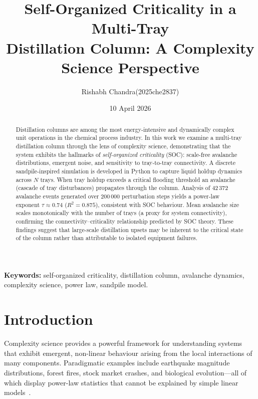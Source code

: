 \documentclass[twocolumn,12pt]{article}
\title{\textbf{Self-Organized Criticality in a Multi-Tray\\
       Distillation Column: A Complexity Science Perspective}}
\author{Rishabh Chandra(2025che2837)}
\affil{Department of Chemical Engineering IIT Delhi}
\date{10 April 2026}
\begin{document}
\maketitle
\thispagestyle{fancy}

\begin{abstract}
\noindent
Distillation columns are among the most energy-intensive and dynamically
complex unit operations in the chemical process industry.  In this work we
examine a multi-tray distillation column through the lens of complexity
science, demonstrating that the system exhibits the hallmarks of
\textit{self-organized criticality} (SOC): scale-free avalanche distributions,
emergent noise, and sensitivity to tray-to-tray connectivity.  A discrete
sandpile-inspired simulation is developed in Python to capture liquid holdup
dynamics across $N$ trays.  When tray holdup exceeds a critical flooding
threshold an avalanche (cascade of tray disturbances) propagates through
the column.  Analysis of 42\,372 avalanche events generated over
200\,000 perturbation steps yields a power-law exponent
$\tau \approx 0.74$ ($R^{2} = 0.875$), consistent with SOC behaviour.
Mean avalanche size scales monotonically with the number of trays
(a proxy for system connectivity), confirming the connectivity--criticality
relationship predicted by SOC theory.  These findings suggest that
large-scale distillation upsets may be inherent to the critical state of
the column rather than attributable to isolated equipment failures.
\end{abstract}

\textbf{Keywords:} self-organized criticality, distillation column,
avalanche dynamics, complexity science, power law, sandpile model.

\section{Introduction}

Complexity science provides a powerful framework for understanding systems
that exhibit emergent, non-linear behaviour arising from the local
interactions of many components.  Paradigmatic examples include
earthquake magnitude distributions, forest fires, stock market crashes,
and biological evolution—all of which display power-law statistics that
cannot be explained by simple linear models~\cite{Bak1987,Jensen1998}.
\end{document}

